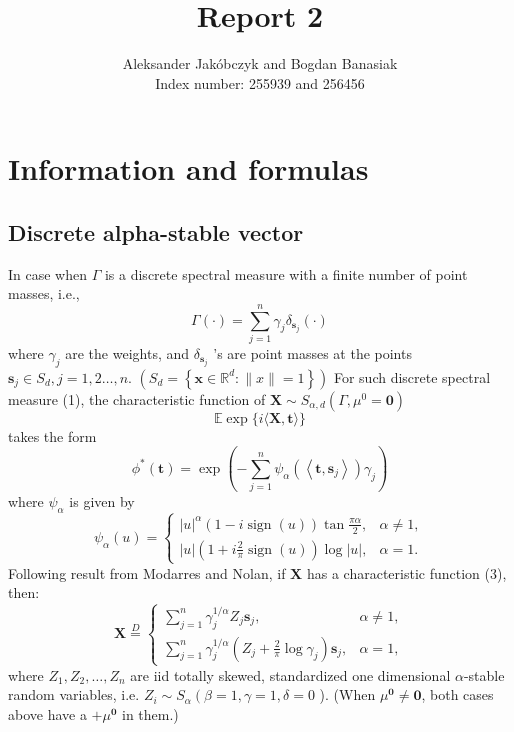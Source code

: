 \documentclass{article}
\title{Report 2}
\author{Aleksander Jakóbczyk and Bogdan Banasiak\\ 
	Index number: 255939 and 256456}
\date{}\date{}
\begin{document}
	\maketitle
	\section{Information and formulas}
	
	
	\subsection{Discrete alpha-stable vector}
	In case when $\Gamma$ is a discrete spectral measure with a finite number of point masses, i.e.,
	$$
	\Gamma(\cdot)=\sum_{j=1}^n \gamma_j \delta_{\mathbf{s}_j}(\cdot)
	$$
	where $\gamma_j$ are the weights, and $\delta_{\mathbf{s}_j}$ 's are point masses at the points $\mathbf{s}_j \in S_d, j=1,2 \ldots, n$. $\left(S_d=\left\{\mathbf{x} \in \mathbb{R}^d:\|x\|=1\right\}\right)$
	For such discrete spectral measure (1), the characteristic function of $\mathbf{X} \sim S_{\alpha, d}\left(\Gamma, \mu^0=\mathbf{0}\right)$
	$$
	\mathbb{E} \exp \{i\langle\mathbf{X}, \mathbf{t}\rangle\}
	$$
	takes the form
	$$
	\phi^*(\mathbf{t})=\exp \left(-\sum_{j=1}^n \psi_\alpha\left(\left\langle\mathbf{t}, \mathbf{s}_j\right\rangle\right) \gamma_j\right)
	$$
	where $\psi_\alpha$ is given by
	$$
	\psi_\alpha(u)= \begin{cases}|u|^\alpha(1-i \operatorname{sign}(u)) \tan \frac{\pi \alpha}{2}, & \alpha \neq 1, \\ |u|\left(1+i \frac{2}{\pi} \operatorname{sign}(u)\right) \log |u|, & \alpha=1 .\end{cases}
	$$
	Following result from Modarres and Nolan, if $\mathbf{X}$ has a characteristic function (3), then:
	$$
	\mathbf{X} \stackrel{D}{=} \begin{cases}\sum_{j=1}^n \gamma_j^{1 / \alpha} Z_j \mathbf{s}_j, & \alpha \neq 1, \\ \sum_{j=1}^n \gamma_j^{1 / \alpha}\left(Z_j+\frac{2}{\pi} \log \gamma_j\right) \mathbf{s}_j, & \alpha=1,\end{cases}
	$$
	where $Z_1, Z_2, \ldots, Z_n$ are iid totally skewed, standardized one dimensional $\alpha$-stable random variables, i.e. $Z_i \sim S_\alpha\left(\beta=1, \gamma=1, \delta=0\right.$ ). (When $\mu^{\mathbf{0}} \neq \mathbf{0}$, both cases above have a $+\mu^{\mathbf{0}}$ in them.)
	
\end{document}
